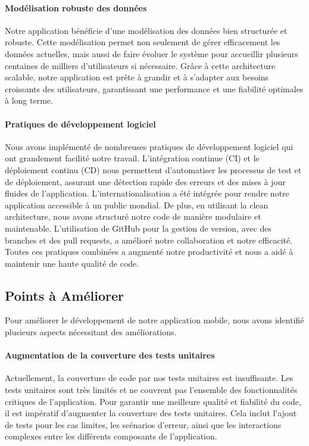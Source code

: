 \paragraph{Modélisation robuste des données}
Notre application bénéficie d'une modélisation des données bien structurée et robuste. Cette modélisation permet non seulement de gérer efficacement les données actuelles, mais aussi de faire évoluer le système pour accueillir plusieurs centaines de milliers d'utilisateurs si nécessaire. Grâce à cette architecture scalable, notre application est prête à grandir et à s'adapter aux besoins croissants des utilisateurs, garantissant une performance et une fiabilité optimales à long terme.

\paragraph{Pratiques de développement logiciel}
Nous avons implémenté de nombreuses pratiques de développement logiciel qui ont grandement facilité notre travail. L'intégration continue (CI) et le déploiement continu (CD) nous permettent d'automatiser les processus de test et de déploiement, assurant une détection rapide des erreurs et des mises à jour fluides de l'application. L'internationalisation a été intégrée pour rendre notre application accessible à un public mondial. De plus, en utilisant la clean architecture, nous avons structuré notre code de manière modulaire et maintenable. L'utilisation de GitHub pour la gestion de version, avec des branches et des pull requests, a amélioré notre collaboration et notre efficacité. Toutes ces pratiques combinées a augmenté notre productivité et nous a aidé à maintenir une haute qualité de code.





\subsection{Points à Améliorer}

Pour améliorer le développement de notre application mobile, nous avons identifié plusieurs aspects nécessitant des améliorations.

\paragraph{Augmentation de la couverture des tests unitaires}
Actuellement, la couverture de code par nos tests unitaires est insuffisante. Les tests unitaires sont très limités et ne couvrent pas l'ensemble des fonctionnalités critiques de l'application. Pour garantir une meilleure qualité et fiabilité du code, il est impératif d'augmenter la couverture des tests unitaires. Cela inclut l'ajout de tests pour les cas limites, les scénarios d'erreur, ainsi que les interactions complexes entre les différents composants de l'application.

